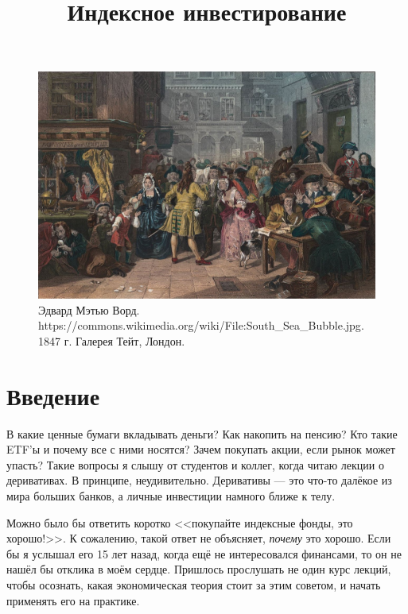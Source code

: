 
\title{Индексное инвестирование}



\maketitle
\thispagestyle{empty}

\begin{figure}[h]
\centering
\includegraphics[width=\textwidth]{south_sea_bubble.jpg}
\captionsetup{labelformat=empty}
\caption{\small{
Эдвард Мэтью Ворд. 
{https://commons.wikimedia.org/wiki/File:South_Sea_Bubble.jpg}.
1847 г. Галерея Тейт, Лондон.
}}
\end{figure}
\setcounter{figure}{0}

\tableofcontents

\newcommand{\sectionWithToc}[1] {
	\section*{#1}
	\addcontentsline{toc}{section}{#1}
}

\sectionWithToc{Введение}

В какие ценные бумаги вкладывать деньги? Как накопить на пенсию? Кто такие ETF'ы 
и почему все с ними носятся? Зачем покупать акции, если рынок может упасть? 
Такие вопросы я слышу от студентов и коллег, когда читаю лекции о деривативах. В 
принципе, неудивительно. Деривативы --- это что-то далёкое из мира больших 
банков, а личные инвестиции намного ближе к телу.

Можно было бы ответить коротко <<покупайте индексные фонды, это хорошо!>>. К 
сожалению, такой ответ не объясняет, \emph{почему} это хорошо. Если бы я 
услышал его 15 лет назад, когда ещё не интересовался финансами, то он не нашёл 
бы отклика в моём сердце. Пришлось прослушать не один курс лекций, чтобы 
осознать, какая экономическая теория стоит за этим советом, и начать применять 
его на практике.

